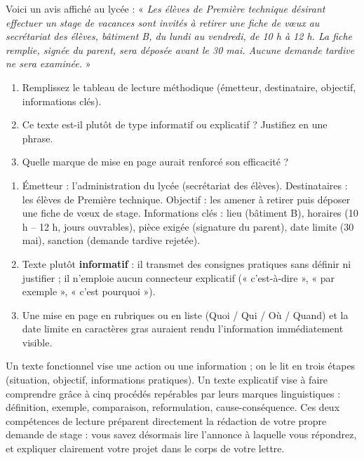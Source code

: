 \documentclass[11pt]{article}
\newcommand{\cle}[1]{{\popxbold\color{popdark}#1}}
\begin{document}
\begin{exercice}
Voici un avis affiché au lycée : « \emph{Les élèves de Première technique désirant effectuer un stage de vacances sont invités à retirer une fiche de vœux au secrétariat des élèves, bâtiment B, du lundi au vendredi, de 10 h à 12 h. La fiche remplie, signée du parent, sera déposée avant le 30 mai. Aucune demande tardive ne sera examinée.} »
\begin{enumerate}
\item Remplissez le tableau de lecture méthodique (émetteur, destinataire, objectif, informations clés).
\item Ce texte est-il plutôt de type informatif ou explicatif ? Justifiez en une phrase.
\item Quelle marque de mise en page aurait renforcé son efficacité ?
\end{enumerate}
\end{exercice}

\begin{corrige}
\begin{enumerate}
\item Émetteur : l'administration du lycée (secrétariat des élèves). Destinataires : les élèves de Première technique. Objectif : les amener à retirer puis déposer une fiche de vœux de stage. Informations clés : lieu (bâtiment B), horaires (10 h – 12 h, jours ouvrables), pièce exigée (signature du parent), date limite (30 mai), sanction (demande tardive rejetée).
\item Texte plutôt \textbf{informatif} : il transmet des consignes pratiques sans définir ni justifier ; il n'emploie aucun connecteur explicatif (« c'est-à-dire », « par exemple », « c'est pourquoi »).
\item Une mise en page en rubriques ou en liste (Quoi / Qui / Où / Quand) et la date limite en caractères gras auraient rendu l'information immédiatement visible.
\end{enumerate}
\end{corrige}

\begin{aretenir}
Un \cle{texte fonctionnel} vise une action ou une information ; on le lit en trois étapes (situation, objectif, informations pratiques). Un \cle{texte explicatif} vise à faire comprendre grâce à cinq procédés repérables par leurs marques linguistiques : définition, exemple, comparaison, reformulation, cause-conséquence. Ces deux compétences de lecture préparent directement la rédaction de votre propre demande de stage : vous savez désormais lire l'annonce à laquelle vous répondrez, et expliquer clairement votre projet dans le corps de votre lettre.
\end{aretenir}
\end{document}
